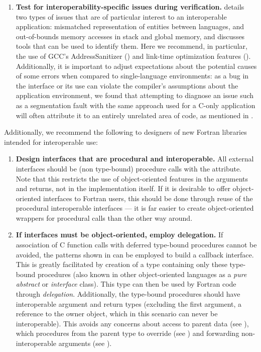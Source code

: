\begin{enumerate}
	\item \textbf{Test for interoperability-specific issues during verification.}  details two types of issues that are of particular interest to an interoperable application: mismatched representation of entities between languages, and out-of-bounds memory accesses in stack and global memory, and discusses tools that can be used to identify them. Here we recommend, in particular, the use of GCC's AddressSanitizer () and link-time optimization features (). Additionally, it is important to adjust expectations about the potential causes of some errors when compared to single-language environments: as a bug in the interface or its use can violate the compiler's assumptions about the application environment, we found that attempting to diagnose an issue such as a segmentation fault with the same approach used for a C-only application will often attribute it to an entirely unrelated area of code, as mentioned in .	
\end{enumerate}

Additionally, we recommend the following to designers of new Fortran libraries intended for interoperable use:
\begin{enumerate}
	\item \textbf{Design interfaces that are procedural and interoperable.} All external interfaces should be (non type-bound) procedure calls with the  attribute. Note that this restricts the use of object-oriented features in the arguments and returns, not in the implementation itself. If it is desirable to offer object-oriented interfaces to Fortran users, this should be done through reuse of the procedural interoperable interfaces --- it is far easier to create object-oriented wrappers for procedural calls than the other way around.
	\item \textbf{If interfaces must be object-oriented, employ delegation.} If association of C function calls with deferred type-bound procedures cannot be avoided, the patterns shown in  can be employed to build a callback interface. This is greatly facilitated by creation of a type containing only these type-bound procedures (also known in other object-oriented languages as a \textit{pure abstract} or \textit{interface} class). This type can then be used by Fortran code through \textit{delegation}. Additionally, the type-bound procedures should have interoperable argument and return types (excluding the first argument, a reference to the owner object, which in this scenario can never be interoperable). This avoids any concerns about access to parent data (see ), which procedures from the parent type to override (see ) and forwarding non-interoperable arguments (see ).
\end{enumerate}
